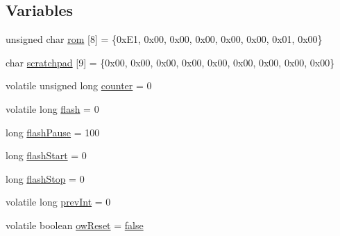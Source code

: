 \subsection*{Variables}
\begin{DoxyCompactItemize}
\item 
unsigned char \hyperlink{OWRain1_8ino_a8beb78e2b3f2cb6e34f34861a875ca0b}{rom} \mbox{[}8\mbox{]} = \{0x\-E1, 0x00, 0x00, 0x00, 0x00, 0x00, 0x01, 0x00\}
\item 
char \hyperlink{OWRain1_8ino_a8248cc51a33adbb2adf4f80c26f0a166}{scratchpad} \mbox{[}9\mbox{]} = \{0x00, 0x00, 0x00, 0x00, 0x00, 0x00, 0x00, 0x00, 0x00\}
\item 
volatile unsigned long \hyperlink{OWRain1_8ino_a2f0666e78dc5ab63f6db5ea2829b6b68}{counter} = 0
\item 
volatile long \hyperlink{OWRain1_8ino_a6d286895480000d2c1591098773da92b}{flash} = 0
\item 
long \hyperlink{OWRain1_8ino_a698f223721ea29263d602fc917b4750e}{flash\-Pause} = 100
\item 
long \hyperlink{OWRain1_8ino_aaf78eebe2bb3002cd3e0445f3009e127}{flash\-Start} = 0
\item 
long \hyperlink{OWRain1_8ino_a5614d105569b9f9003a30e7f76b5b53b}{flash\-Stop} = 0
\item 
volatile long \hyperlink{OWRain1_8ino_add5ef67690d870c53fac0f0d95438bb1}{prev\-Int} = 0
\item 
volatile boolean \hyperlink{OWRain1_8ino_af37159888cdcbe69b079b2c9dbfe3abb}{ow\-Reset} = \hyperlink{stdbool_8h_a65e9886d74aaee76545e83dd09011727}{false}
\end{DoxyCompactItemize}


